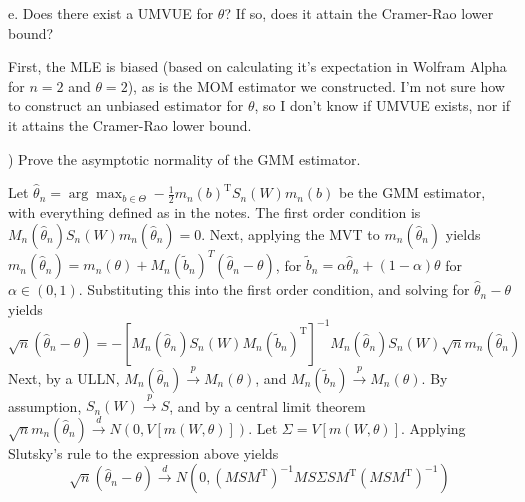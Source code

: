 \documentclass[12pt,english]{article}
\newcommand{\T}{\ensuremath{\text{T}}}
\begin{document}
\vspace{1em}
e. Does there exist a UMVUE for $\theta$? If so, does it attain the
Cramer-Rao lower bound?
\vspace{1em}

First, the MLE is biased (based on calculating it's expectation in Wolfram Alpha for $n = 2$ and $\theta = 2$), as is the MOM estimator we constructed. I'm not sure how to construct an unbiased estimator for $\theta$, so I don't know if UMVUE exists, nor if it attains the Cramer-Rao lower bound.

\vspace{1em}
) Prove the asymptotic normality of the GMM estimator.
\vspace{1em}

Let $\hat{\theta}_{n} = \arg \max_{b \in \Theta} -\frac{1}{2} m_{n}(b)^{\T} S_{n}(W) m_{n}(b)$ be the GMM estimator, with everything defined as in the notes. The first order condition is $M_{n}(\hat{\theta}_{n}) S_{n}(W) m_{n}(\hat{\theta}_{n}) = 0$. Next, applying the MVT to $m_{n}(\hat{\theta}_{n})$ yields $m_{n}(\hat{\theta}_{n}) = m_{n}(\theta) + M_{n}(\tilde{b}_{n})^{T} (\hat{\theta}_{n} - \theta)$, for $\tilde{b}_{n} = \alpha \hat{\theta}_{n} + (1 - \alpha) \theta$ for $\alpha \in (0, 1)$. Substituting this into the first order condition, and solving for $\hat{\theta}_{n} - \theta$ yields
$$ \sqrt{n}(\hat{\theta}_{n} - \theta) = -\left[ M_{n}(\hat{\theta}_{n}) S_{n}(W) M_{n}(\tilde{b}_{n})^{\T} \right]^{-1} M_{n}(\hat{\theta}_{n}) S_{n}(W) \sqrt{n} m_{n}(\hat{\theta}_{n}) $$
Next, by a ULLN, $M_{n}(\hat{\theta}_{n}) \overset{p}{\to} M_{n}(\theta)$, and $M_{n}(\tilde{b}_{n}) \overset{p}{\to} M_{n}(\theta)$. By assumption, $S_{n}(W) \overset{p}{\to} S$, and by a central limit theorem $\sqrt{n} m_{n}(\hat{\theta}_{n}) \overset{d}{\to} N(0, V[m(W, \theta)])$. Let $\Sigma = V[m(W, \theta)]$. Applying Slutsky's rule to the expression above yields
$$ \sqrt{n}(\hat{\theta}_{n} - \theta) \overset{d}{\to} N\left(0, (MSM^{\T})^{-1} MS\Sigma SM^{\T} (MSM^{\T})^{-1} \right) $$
\end{document}
